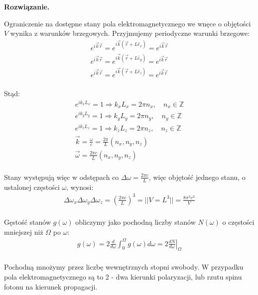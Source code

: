 \documentclass[11pt,a4paper]{article}
\newenvironment{solution}{\vspace{1cm} \par\textbf{Rozwiązanie.} \vspace{1cm}}{}
\begin{document}
\begin{solution}

Ograniczenie na dostępne stany pola elektromagnetycznego we wnęce o objętości $V$ 
wynika z warunków brzegowych. Przyjmujemy periodyczne warunki brzegowe:
\begin{align*}
  e^{i \vec{k} \vec{r}} = e^{i \vec{k} (\vec{r} + L\hat{e}_x)} = e^{i \vec{k} \vec{r}} \\
  e^{i \vec{k} \vec{r}} = e^{i \vec{k} (\vec{r} + L\hat{e}_y)} = e^{i \vec{k} \vec{r}} \\
  e^{i \vec{k} \vec{r}} = e^{i \vec{k} (\vec{r} + L\hat{e}_z)} = e^{i \vec{k} \vec{r}} \\
\end{align*}

Stąd:
\begin{align*}
  e^{i k_x L_x} = 1 \Rightarrow k_x L_x = 2\pi n_x, \quad n_x \in \mathbb{Z} \\
  e^{i k_y L_y} = 1 \Rightarrow k_y L_y = 2\pi n_y, \quad n_y \in \mathbb{Z} \\
  e^{i k_z L_z} = 1 \Rightarrow k_z L_z = 2\pi n_z, \quad n_z \in \mathbb{Z} \\
  \vec{k} = \frac{\omega}{c} = \frac{2\pi}{L} (n_x, n_y, n_z) \\
  \vec{\omega} = \frac{2\pi c}{L} (n_x, n_y, n_z) \\
\end{align*}

Stany występują więc w odstępach co $\Delta \omega = \frac{2\pi c}{L}$,
więc objętość jednego stanu, o ustalonej częstości $\omega$, wynosi:
\begin{align*}
  \Delta \omega_x \Delta \omega_y \Delta \omega_z = 
  \left( \frac{2\pi c}{L} \right)^3 = 
  || V = L^3 || =
  \frac{8\pi^3 c^3}{V} \\
\end{align*}

Gęstość stanów $g(\omega)$ obliczymy jako pochodną liczby stanów 
$N(\omega)$ o częstości mniejszej niż $\Omega$ po $\omega$:
\begin{align*}
  g(\omega) = 2\frac{d}{d\omega} \int_0^{\Omega} g(\omega) d\omega = 
  \left. 2\frac{dN}{d\omega}\right|_{\Omega} \\
\end{align*}

Pochodną mnożymy przez liczbę wewnętrznych stopni swobody.
W przypadku pola elektromagnetycznego są to 2 - dwa 
kierunki polaryzacji, lub rzutu spinu fotonu na kierunek propagacji.


\end{solution}
\end{document}
